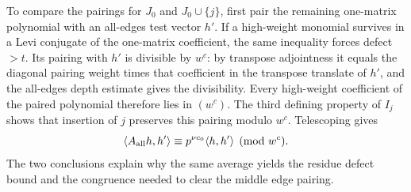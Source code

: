 To compare the pairings for $J_0$ and $J_0\cup\{j\}$, first pair the remaining one-matrix polynomial with an all-edges test vector $h'$. If a high-weight monomial survives in a Levi conjugate of the one-matrix coefficient, the same inequality forces defect $>t$. Its pairing with $h'$ is divisible by $w^c$: by transpose adjointness it equals the diagonal pairing weight times that coefficient in the transpose translate of $h'$, and the all-edges depth estimate gives the divisibility. Every high-weight coefficient of the paired polynomial therefore lies in $(w^c)$. The third defining property of $I_j$ shows that insertion of $j$ preserves this pairing modulo $w^c$. Telescoping gives
\[
 \langle A_{\rm all}h,h'\rangle\equiv p^{\nu c_0}\langle h,h'\rangle
 \pmod {w^c}.
\]
The two conclusions explain why the same average yields the residue defect bound and the congruence needed to clear the middle edge pairing.

